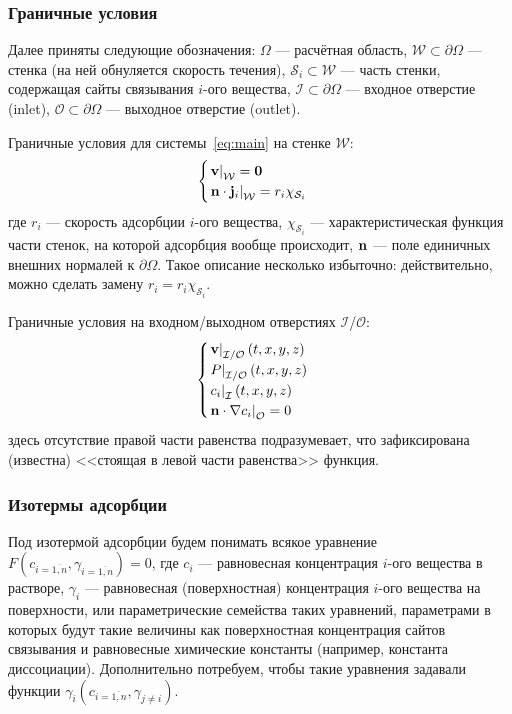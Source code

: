 \documentclass[oneside,final,12pt]{extreport}
\begin{document}
\subsubsection*{Граничные условия}
Далее приняты следующие обозначения: $\Omega$ --- расчётная область,
$\mathcal{W} \subset \partial\Omega$ --- стенка
(на ней обнуляется скорость течения),
$\mathcal{S}_i \subset \mathcal{W}$ --- часть стенки,
содержащая сайты связывания $i$-ого вещества,
$\mathcal{I} \subset \partial\Omega$ --- входное отверстие (inlet),
$\mathcal{O} \subset \partial\Omega$ --- выходное отверстие (outlet).

Граничные условия для системы~\eqref{eq:main} на стенке $\mathcal{W}$:
\begin{equation}
\begin{cases}
  \left. \vb v \right|_{\mathcal{W}} = \vb 0 \\
  \left. \vb n \cdot \vb j_i \right|_{\mathcal{W}} = r_i\chi_{\mathcal{S}_i}
\end{cases}
\label{eq:main:bc_walls}
\end{equation}
где $r_i$ --- скорость адсорбции $i$-ого вещества,
$\chi_{\mathcal{S}_i}$ --- характеристическая функция части стенок,
на которой адсорбция вообще происходит,
$\vb n$ --- поле единичных внешних нормалей к $\partial \Omega$.
Такое описание несколько избыточно: действительно, можно сделать замену
$r_i = r_i\chi_{\mathcal{S}_i}$.

Граничные условия на входном/выходном отверстиях $\mathcal{I}$/$\mathcal{O}$:
\begin{equation}
\begin{cases}
  \left. \vb v \right|_{\mathcal{I}/\mathcal{O}}\left(t, x, y, z\right) \\
  \left. P \right|_{\mathcal{I}/\mathcal{O}}\left(t, x, y, z\right) \\
  \left. c_i \right|_{\mathcal{I}}\left(t, x, y, z\right) \\
  \left. \vb n \cdot \nabla c_i \right|_{\mathcal{O}} = 0 \\
\end{cases}
\label{eq:main:bc_io}
\end{equation}
здесь отсутствие правой части равенства подразумевает, что зафиксирована
(известна) <<стоящая в левой части равенства>> функция.


\subsubsection*{Изотермы адсорбции}
Под изотермой адсорбции будем понимать всякое уравнение
$F\left(c_{i=\overline{1,n}}, \gamma_{i=\overline{1,n}}\right) = 0$, где
$c_i$ --- равновесная концентрация $i$-ого вещества в растворе,
$\gamma_i$ --- равновесная (поверхностная) концентрация $i$-ого вещества
на поверхности, или параметрические семейства таких уравнений,
параметрами в которых будут такие величины как
поверхностная концентрация сайтов связывания и
равновесные химические константы (например, константа диссоциации).
Дополнительно потребуем, чтобы такие уравнения задавали функции
$\gamma_i\left(c_{i=\overline{1,n}}, \gamma_{j\neq i}\right)$.
\end{document}
